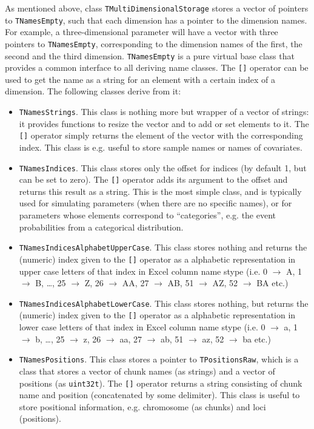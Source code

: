 \documentclass[a4paper,11pt]{article}
\newcommand{\class}[1]{\texttt{#1}}
\begin{document}
As mentioned above, class \class{TMultiDimensionalStorage} stores a vector of pointers to \class{TNamesEmpty}, such that each dimension has a pointer to the dimension names. For example, a three-dimensional parameter will have a vector with three pointers to \class{TNamesEmpty}, corresponding to the dimension names of the first, the second and the third dimension. \class{TNamesEmpty} is a pure virtual base class that provides a common interface to all deriving name classes. The \texttt{[]} operator can be used to get the name as a string for an element with a certain index of a dimension. The following classes derive from it:
\begin{itemize}
 \item \class{TNamesStrings}. This class is nothing more but wrapper of a vector of strings: it provides functions to resize the vector and to add or set elements to it. The \texttt{[]} operator simply returns the element of the vector with the corresponding index. This class is e.g. useful to store sample names or names of covariates.
 \item \class{TNamesIndices}. This class stores only the offset for indices (by default 1, but can be set to zero). The \texttt{[]} operator adds its argument to the offset and returns this result as a string. This is the most simple class, and is typically used for simulating parameters (when there are no specific names), or for parameters whose elements correspond to ``categories'', e.g. the event probabilities from a categorical distribution.
 \item \class{TNamesIndicesAlphabetUpperCase}. This class stores nothing and returns the (numeric) index given to the \texttt{[]} operator as a alphabetic representation in upper case letters of that index in Excel column name stype (i.e. 0 $\to$ A, 1 $\to$ B, \ldots, 25 $\to$ Z, 26 $\to$ AA, 27 $\to$ AB, 51 $\to$ AZ, 52 $\to$ BA etc.)
  \item \class{TNamesIndicesAlphabetLowerCase}. This class stores nothing, but returns the (numeric) index given to the \texttt{[]} operator as a alphabetic representation in lower case letters of that index in Excel column name stype (i.e. 0 $\to$ a, 1 $\to$ b, \ldots, 25 $\to$ z, 26 $\to$ aa, 27 $\to$ ab, 51 $\to$ az, 52 $\to$ ba etc.)
 \item \class{TNamesPositions}. This class stores a pointer to \class{TPositionsRaw}, which is a class that stores a vector of chunk names (as strings) and a vector of positions (as \texttt{uint32{\textunderscore}t}). The \texttt{[]} operator returns a string consisting of chunk name and position (concatenated by some delimiter). This class is useful to store positional information, e.g. chromosome (as chunks) and loci (positions).
\end{itemize}
\end{document}
